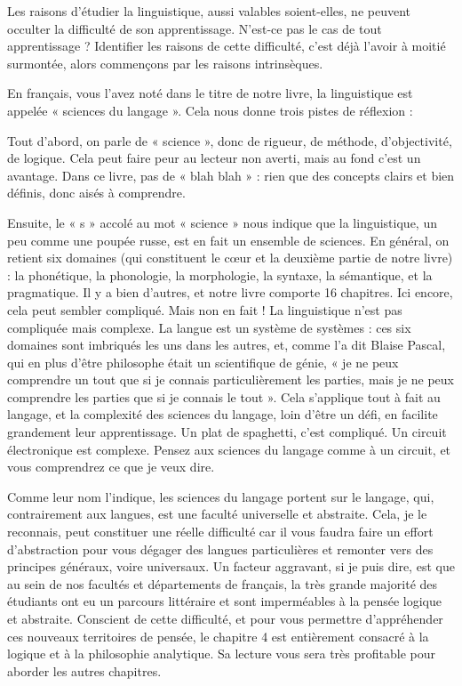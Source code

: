 Les raisons d’étudier la linguistique, aussi valables soient-elles, ne peuvent occulter la difficulté de son apprentissage. N’est-ce pas le cas de tout apprentissage ? Identifier les raisons de cette difficulté, c’est déjà l’avoir à moitié surmontée, alors commençons par les raisons intrinsèques.

En français, vous l’avez noté dans le titre de notre livre, la linguistique est appelée « sciences du langage ». Cela nous donne trois pistes de réflexion :

Tout d’abord, on parle de « science », donc de rigueur, de méthode, d’objectivité, de logique. Cela peut faire peur au lecteur non averti, mais au fond c’est un avantage. Dans ce livre, pas de « blah blah » : rien que des concepts clairs et bien définis, donc aisés à comprendre.

Ensuite, le « s » accolé au mot « science » nous indique que la linguistique, un peu comme une poupée russe, est en fait un ensemble de sciences. En général, on retient six domaines (qui constituent le cœur et la deuxième partie de notre livre) : la phonétique, la phonologie, la morphologie, la syntaxe, la sémantique, et la pragmatique. Il y a bien d’autres, et notre livre comporte 16 chapitres. Ici encore, cela peut sembler compliqué. Mais non en fait ! La linguistique n’est pas compliquée mais complexe. La langue est un système de systèmes : ces six domaines sont imbriqués les uns dans les autres, et, comme l’a dit Blaise Pascal, qui en plus d’être philosophe était un scientifique de génie, « je ne peux comprendre un tout que si je connais particulièrement les parties, mais je ne peux comprendre les parties que si je connais le tout ». Cela s’applique tout à fait au langage, et la complexité des sciences du langage, loin d’être un défi, en facilite grandement leur apprentissage. Un plat de spaghetti, c’est compliqué. Un circuit électronique est complexe. Pensez aux sciences du langage comme à un circuit, et vous comprendrez ce que je veux dire.

Comme leur nom l’indique, les sciences du langage portent sur le langage, qui, contrairement aux langues, est une faculté universelle et abstraite. Cela, je le reconnais, peut constituer une réelle difficulté car il vous faudra faire un effort d’abstraction pour vous dégager des langues particulières et remonter vers des principes généraux, voire universaux. Un facteur aggravant, si je puis dire, est que au sein de nos facultés et départements de français, la très grande majorité des étudiants ont eu un parcours littéraire et sont imperméables à la pensée logique et abstraite. Conscient de cette difficulté, et pour vous permettre d’appréhender ces nouveaux territoires de pensée, le chapitre 4 est entièrement consacré à la logique et à la philosophie analytique. Sa lecture vous sera très profitable pour aborder les autres chapitres.

